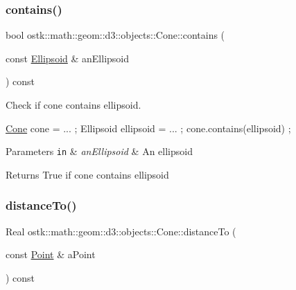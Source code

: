 \subsubsection{\texorpdfstring{contains()}{contains()}\hspace{0.1cm}{\footnotesize\ttfamily [6/6]}}
{\footnotesize\ttfamily bool ostk\+::math\+::geom\+::d3\+::objects\+::\+Cone\+::contains (\begin{DoxyParamCaption}\item[{const \hyperlink{classostk_1_1math_1_1geom_1_1d3_1_1objects_1_1_ellipsoid}{Ellipsoid} \&}]{an\+Ellipsoid }\end{DoxyParamCaption}) const}



Check if cone contains ellipsoid. 


\begin{DoxyCode}
\hyperlink{classostk_1_1math_1_1geom_1_1d3_1_1objects_1_1_cone_ac86773a78cf513900e8b0d3a2709bfcb}{Cone} cone = ... ;
Ellipsoid ellipsoid = ... ;
cone.contains(ellipsoid) ;
\end{DoxyCode}



\begin{DoxyParams}[1]{Parameters}
\mbox{\tt in}  & {\em an\+Ellipsoid} & An ellipsoid \\
\hline
\end{DoxyParams}
\begin{DoxyReturn}{Returns}
True if cone contains ellipsoid 
\end{DoxyReturn}
\mbox{\label{classostk_1_1math_1_1geom_1_1d3_1_1objects_1_1_cone_acc52be69d703991cdda1debcb9f11ec9}} 
\subsubsection{\texorpdfstring{distance\+To()}{distanceTo()}}
{\footnotesize\ttfamily Real ostk\+::math\+::geom\+::d3\+::objects\+::\+Cone\+::distance\+To (\begin{DoxyParamCaption}\item[{const \hyperlink{classostk_1_1math_1_1geom_1_1d3_1_1objects_1_1_point}{Point} \&}]{a\+Point }\end{DoxyParamCaption}) const}



